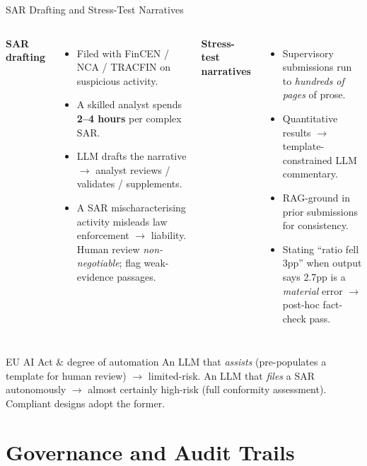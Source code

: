 \documentclass[9pt,t]{beamer}
\begin{document}
\begin{frame}{SAR Drafting and Stress-Test Narratives}
\begin{columns}[T]
\textbf{SAR drafting}
\begin{itemize}\footnotesize
  \item Filed with FinCEN / NCA / TRACFIN on suspicious activity.
  \item A skilled analyst spends \textbf{2--4 hours} per complex SAR.
  \item LLM drafts the narrative $\to$ analyst reviews / validates / supplements.
  \item A SAR mischaracterising activity misleads law enforcement $\to$ liability.
        Human review \emph{non-negotiable}; flag weak-evidence passages.
\end{itemize}

\textbf{Stress-test narratives}
\begin{itemize}\footnotesize
  \item Supervisory submissions run to \emph{hundreds of pages} of prose.
  \item Quantitative results $\to$ template-constrained LLM commentary.
  \item RAG-ground in prior submissions for consistency.
  \item Stating ``ratio fell 3pp'' when output says 2.7pp is a \emph{material}
        error $\to$ post-hoc fact-check pass.
\end{itemize}
\end{columns}

\medskip
\begin{alertblock}{EU AI Act \& degree of automation}
An LLM that \emph{assists} (pre-populates a template for human review) $\to$
limited-risk. An LLM that \emph{files} a SAR autonomously $\to$ almost certainly
high-risk (full conformity assessment). Compliant designs adopt the former.
\end{alertblock}
\end{frame}

\section{Governance and Audit Trails}
\end{document}
